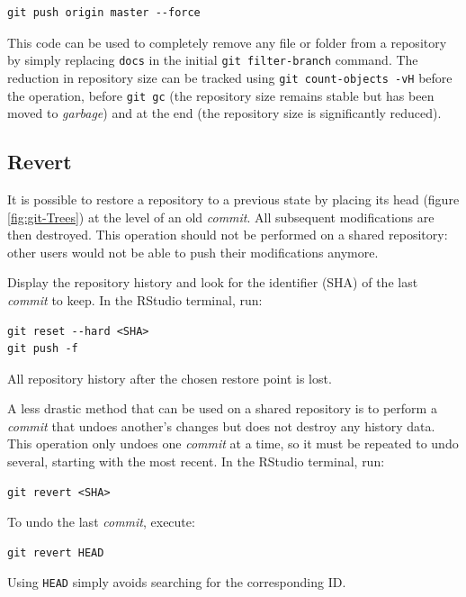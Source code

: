 \documentclass[
  12pt,
  american,
  a4paper,
  extrafontsizes,onecolumn,openright
  ]{memoir}
\newlength{\rf}
\begin{document}
\begin{verbatim}
git push origin master --force
\end{verbatim}

This code can be used to completely remove any file or folder from a repository by simply replacing \texttt{docs} in the initial \texttt{git\ filter-branch} command.
The reduction in repository size can be tracked using \texttt{git\ count-objects\ -vH} before the operation, before \texttt{git\ gc} (the repository size remains stable but has been moved to \emph{garbage}) and at the end (the repository size is significantly reduced).

\subsection{Revert}\label{revert-1}

It is possible to restore a repository to a previous state by placing its head (figure \ref{fig:git-Trees}) at the level of an old \emph{commit}.
All subsequent modifications are then destroyed.
This operation should not be performed on a shared repository: other users would not be able to push their modifications anymore.

Display the repository history and look for the identifier (SHA) of the last \emph{commit} to keep.
In the RStudio terminal, run:

\begin{verbatim}
git reset --hard <SHA>
git push -f
\end{verbatim}

All repository history after the chosen restore point is lost.

A less drastic method that can be used on a shared repository is to perform a \emph{commit} that undoes another's changes but does not destroy any history data.
This operation only undoes one \emph{commit} at a time, so it must be repeated to undo several, starting with the most recent.
In the RStudio terminal, run:

\begin{verbatim}
git revert <SHA>
\end{verbatim}

To undo the last \emph{commit}, execute:

\begin{verbatim}
git revert HEAD
\end{verbatim}

Using \texttt{HEAD} simply avoids searching for the corresponding ID.
\end{document}
